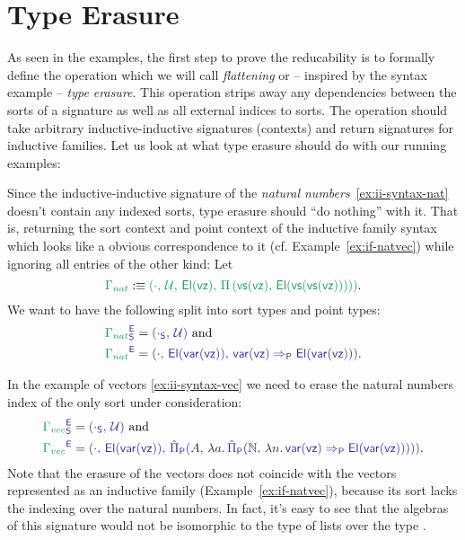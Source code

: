 \section{Type Erasure}

As seen in the examples, the first step to prove the reducability is to formally
define the operation which we will call \emph{flattening} or -- inspired by
the syntax example -- \emph{type erasure}.
This operation strips away any dependencies between the sorts of a signature
as well as all external indices to sorts.
The operation should take arbitrary inductive-inductive signatures (contexts) and
return signatures for inductive families.
Let us look at what type erasure should do with our running examples:

\begin{example}\label{ex:red-e-nat}
Since the inductive-inductive signature of the \emph{natural numbers}~\ref{ex:ii-syntax-nat} doesn't
contain any indexed sorts, type erasure should ``do nothing'' with it.
That is, returning the sort context and point context of the inductive family
syntax which looks like a obvious correspondence to it (cf. Example~\ref{ex:if-natvec})
while ignoring all entries of the other kind:
Let
\begin{equation*}
\grm{\Gamma_{nat}} 
  :\equiv \grm{(\cdot,\, \UU,\, \El(\vz),\, \Pi\left(\vs(\vz),\, \El(\vs(\vs(\vz)))\right))}
  \text{.}
\end{equation*}
We want to have the following split into sort types and point types:
\begin{align*}
\tqm{\grm{\Gamma_{nat}}^\EE_\Sc}
 &= \tqm{(\cdot_\Sc,\, \UU)} \text{ and} \\
\tqm{\grm{\Gamma_{nat}}^\EE}
 &= \tqm{(\cdot,\, \El(\var(\vz)),\, \var(\vz) \Rightarrow_\Pc \El(\var(\vz)))} \text{.}
\end{align*}
\end{example}

\begin{example}[Vectors]\label{ex:red-e-vec}
In the example of vectors \ref{ex:ii-syntax-vec} we need to erase the natural numbers
index of the only sort under consideration:
\begin{align*}
\tqm{\grm{\Gamma_{vec}}^\EE_\Sc}
 &= \tqm{(\cdot_\Sc,\, \UU)} \text{ and} \\
\tqm{\grm{\Gamma_{vec}}^\EE}
  &= \tqm{(\cdot,\, \El(\var(\vz)),\, 
    \ExtPiP{A}{\blm{\lambda a.\,}\ExtPiP{\N}{\blm{\lambda n.\,}
    \var(\vz) \Rightarrow_\Pc \El(\var(\vz))}})} \text{.}
\end{align*}
Note that the erasure of the vectors does not coincide with the vectors represented
as an inductive family (Example~\ref{ex:if-natvec}), because its sort lacks the
indexing over the natural numbers.
In fact, it's easy to see that the algebras of this signature would not be isomorphic
to the type of lists over the type .
\end{example}

